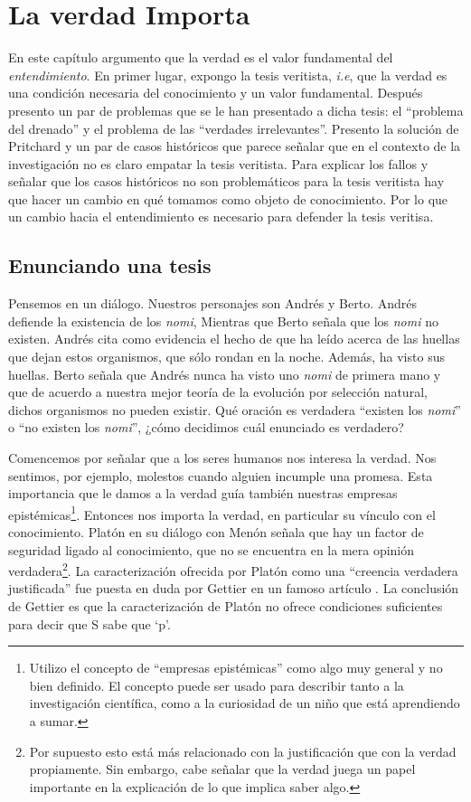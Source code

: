 \documentclass{article}
\begin{document}
\listoftodos

\chapter{La verdad Importa}

\noindent En este capítulo argumento que la verdad es el valor fundamental del \textit{entendimiento}. En primer lugar, expongo la tesis veritista, \textit{i.e}, que la verdad es una condición necesaria del conocimiento y un valor fundamental. Después presento un par de problemas que se le han presentado a dicha tesis: el ``problema del drenado'' y el problema de las ``verdades irrelevantes''. Presento la solución de Pritchard y un par de casos históricos que parece señalar que en el contexto de la investigación no es claro empatar la tesis veritista. Para explicar los fallos y señalar que los casos históricos no son problemáticos para la tesis veritista hay que hacer un cambio en qué tomamos como objeto de conocimiento. Por lo que un cambio hacia el entendimiento es necesario para defender la tesis veritisa.

\section{Enunciando una tesis} \label{enunc}

\noindent Pensemos en un diálogo. Nuestros personajes son Andrés y Berto. Andrés defiende la existencia de los \textit{nomi}, Mientras que Berto señala que los \textit{nomi} no existen. Andrés cita como evidencia el hecho de que ha leído acerca de las huellas que dejan estos organismos, que sólo rondan en la noche. Además, ha visto sus huellas. Berto señala que Andrés nunca ha visto uno \textit{nomi} de primera mano y que de acuerdo a nuestra mejor teoría de la evolución por selección natural, dichos organismos no pueden existir. Qué oración es verdadera ``existen los \textit{nomi}'' o ``no existen los \textit{nomi}'', ¿cómo decidimos cuál enunciado es verdadero?

Comencemos por señalar que a los seres humanos nos interesa la verdad. Nos sentimos, por ejemplo, molestos cuando alguien incumple una promesa. Esta importancia que le damos a la verdad guía también nuestras empresas epistémicas\footnote{Utilizo el concepto de ``empresas epistémicas'' como algo muy general y no bien definido. El concepto puede ser usado para describir tanto a la investigación científica, como a la curiosidad de un niño que está aprendiendo a sumar.}. Entonces nos importa la verdad, en particular su vínculo con el conocimiento. Platón en su diálogo con Menón \citeyear[\P\P 97a-98b]{platonmeno} señala que hay un factor de seguridad ligado al conocimiento, que no se encuentra en la mera opinión verdadera\footnote{Por supuesto esto está más relacionado con la justificación que con la verdad propiamente. Sin embargo, cabe señalar que la verdad juega un papel importante en la explicación de lo que implica saber algo.}. La caracterización ofrecida por Platón como una ``creencia verdadera justificada'' fue puesta en duda por Gettier en un famoso artículo \citeyear{Gettier}. La conclusión de Gettier es que la caracterización de Platón no ofrece condiciones suficientes para decir que S sabe que `p'.
\end{document}
